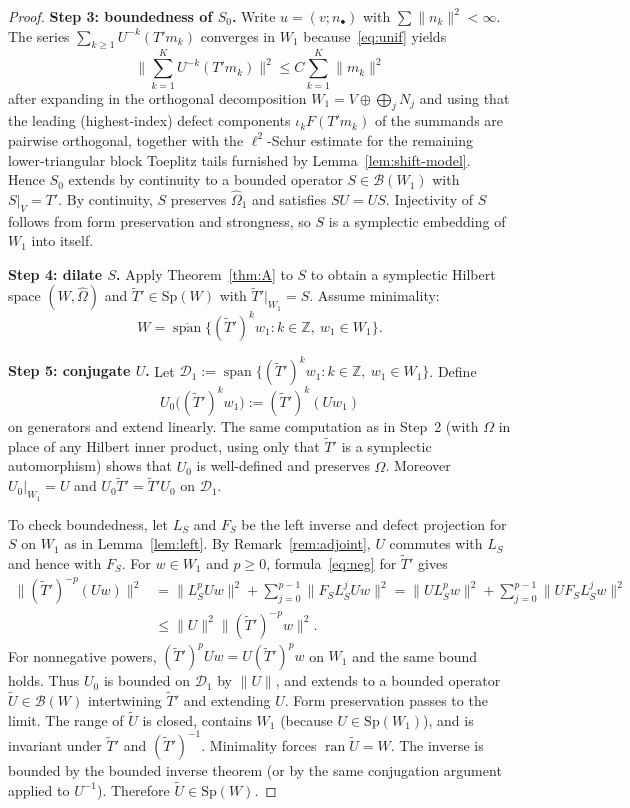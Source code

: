 \documentclass[11pt,a4paper]{article}
\theoremstyle{definition}
\newcommand{\Z}{\mathbb{Z}}
\begin{document}
\begin{proof}
\medskip
\noindent\textbf{Step 3: boundedness of \(S_0\).}
Write \(u=(v;n_\bullet)\) with \(\sum\|n_k\|^2<\infty\). The series
\(\sum_{k\ge 1}U^{-k}(T'm_k)\) converges in \(W_1\) because~\eqref{eq:unif} yields
\[
\biggl\|\sum_{k=1}^K U^{-k}(T'm_k)\biggr\|^2
\le C\sum_{k=1}^K\|m_k\|^2
\]
after expanding in the orthogonal decomposition \(W_1=V\oplus\bigoplus_j N_j\) and using that the
leading (highest-index) defect components \(\iota_k F(T'm_k)\) of the summands are pairwise
orthogonal, together with the \(\ell^2\)-Schur estimate for the remaining lower-triangular block
Toeplitz tails furnished by Lemma~\ref{lem:shift-model}. Hence \(S_0\) extends by continuity to a
bounded operator \(S\in\mathcal{B}(W_1)\) with \(S|_V=T'\). By continuity, \(S\) preserves
\(\widehat{\Omega}_1\) and satisfies \(SU=US\). Injectivity of \(S\) follows from form preservation
and strongness, so \(S\) is a symplectic embedding of \(W_1\) into itself.

\medskip
\noindent\textbf{Step 4: dilate \(S\).}
Apply Theorem~\ref{thm:A} to \(S\) to obtain a symplectic Hilbert space
\((W,\widehat{\Omega})\) and \(\widetilde{T}'\in\mathrm{Sp}(W)\) with
\(\widetilde{T}'|_{W_1}=S\). Assume minimality:
\[
W=\overline{\operatorname{span}}\{(\widetilde{T}')^k w_1:k\in\Z,\ w_1\in W_1\}.
\]

\medskip
\noindent\textbf{Step 5: conjugate \(U\).}
Let \(\mathcal{D}_1:=\operatorname{span}\{(\widetilde{T}')^k w_1:k\in\Z,\ w_1\in W_1\}\). Define
\[
U_0\bigl((\widetilde{T}')^k w_1\bigr):=(\widetilde{T}')^k(U w_1)
\]
on generators and extend linearly. The same computation as in Step~2 (with \(\Omega\) in place of
any Hilbert inner product, using only that \(\widetilde{T}'\) is a symplectic automorphism) shows
that \(U_0\) is well-defined and preserves \(\widehat{\Omega}\). Moreover \(U_0|_{W_1}=U\) and
\(U_0\widetilde{T}'=\widetilde{T}'U_0\) on \(\mathcal{D}_1\).

To check boundedness, let \(L_S\) and \(F_S\) be the left inverse and defect projection for \(S\) on
\(W_1\) as in Lemma~\ref{lem:left}. By Remark~\ref{rem:adjoint}, \(U\) commutes with \(L_S\) and
hence with \(F_S\). For \(w\in W_1\) and \(p\ge 0\), formula~\eqref{eq:neg} for \(\widetilde{T}'\)
gives
\begin{align*}
\|(\widetilde{T}')^{-p}(Uw)\|^2
&=\|L_S^p Uw\|^2+\sum_{j=0}^{p-1}\|F_S L_S^j Uw\|^2
=\|U L_S^p w\|^2+\sum_{j=0}^{p-1}\|U F_S L_S^j w\|^2\\
&\le\|U\|^2\|(\widetilde{T}')^{-p}w\|^2.
\end{align*}
For nonnegative powers, \((\widetilde{T}')^p Uw=U(\widetilde{T}')^p w\) on \(W_1\) and the same
bound holds. Thus \(U_0\) is bounded on \(\mathcal{D}_1\) by \(\|U\|\), and extends to a bounded
operator \(\widetilde{U}\in\mathcal{B}(W)\) intertwining \(\widetilde{T}'\) and extending \(U\).
Form preservation passes to the limit. The range of \(\widetilde{U}\) is closed, contains \(W_1\)
(because \(U\in\mathrm{Sp}(W_1)\)), and is invariant under \(\widetilde{T}'\) and
\((\widetilde{T}')^{-1}\). Minimality forces \(\operatorname{ran}\widetilde{U}=W\). The inverse is
bounded by the bounded inverse theorem (or by the same conjugation argument applied to
\(U^{-1}\)). Therefore \(\widetilde{U}\in\mathrm{Sp}(W)\).


\end{proof}
\end{document}
